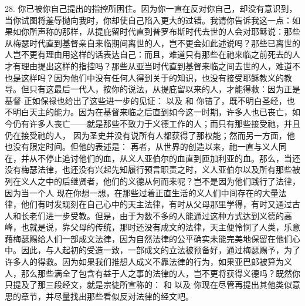28. 你已被你自己提出的指控所困住。因为你一直在反对你自己，却没有意识到，当你试图将羞辱抛向我时，你却使自己陷入更大的过错。我请你告诉我这一点：如果如你所声称的那样，从提庇留时代直到普罗布斯时代去世的人会对耶稣说：那些从梅瑟时代直到基督亲自来临期间离世的人，岂不更会如此述说吗？那些已离世的人岂不更有理由用这样的话表达自己：而且，难道只有那些在祂来临之前死去的人才有理由提出这样的指控吗？那些从亚当时代直到基督来临之间去世的人，难道不也是这样吗？因为他们中没有任何人得到关于的知识，也没有接受耶稣教义的教导。但只有这最后一代人，按你的说法，从提庇留以来的人，才能得救：因为正是基督 正如保禄也给出了这些进一步的见证： 以及 和 你错了，既不明白圣经，也不明白天主的能力。因为在基督来临之后直到如今这一时期，许多人也已丧亡，如今仍有许多人丧亡——就是那些不致力于义德工作的人；而只有那些接受祂，并且仍在接受祂的人， 因为圣史并没有说所有人都获得了那权能；然而另一方面，他也没有限定时间。但他的表述是： 再者，从世界的创造以来，祂一直与义人同在，并从不停止追讨他们的血，从义人亚伯尔的血直到匝加利亚的血。那么，当还没有梅瑟法律，也还没有兴起先知履行预言职责之时，义人亚伯尔以及所有那些被列在义人之中的后继贤者，他们的义德从何而来呢？岂不是因为他们践行了法律， 因为当一个人 现在你想一想，在那些过着正直生活的义人们中间存在的大量法律，他们有时发现刻在自己心中的天主法律，有时从父母那里学得，有时又通过古人和长老们进一步受教。但是，由于为数不多的人能通过这种方式达到义德的高峰，也就是说，靠父母的传统，那时还没有成文的法律，天主便怜悯了人类，乐意藉梅瑟赐给人们一部成文法律，因为自然法律的公平确实未能完美地保留在他们心中。因此，与人起初的受造一致，一部成文的立法被预备好，通过梅瑟赐予，为了许多人的得救。因为如果我们推想人成义不靠法律的行为，如果亚巴郎被算为义人，那么那些满全了包含有益于人之事的法律的人，岂不更将获得义德吗？既然你只提及了那三段经文，就是宗徒所宣称的： 和 以及 你现在尽管再提出其他类似意思的章节，并尽量找出那些看似反对法律的经文吧。\par

